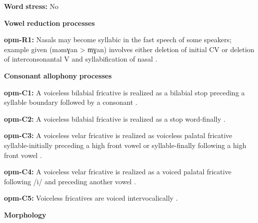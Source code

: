 \documentclass[output=paper]{langsci/langscibook}
\begin{document}
\begin{styleBody}
\textbf{Word} \textbf{stress:} No
\end{styleBody}

\begin{styleBody}
\textbf{Vowel} \textbf{reduction} \textbf{processes}
\end{styleBody}

\begin{styleBody}
\textbf{opm-R1:} Nasals may become syllabic in the fast speech of some speakers; example given (məmɣan > m̩ɣan) involves either deletion of initial CV or deletion of interconsonantal V and syllabification of nasal \citep[64]{Loughnane2009}.
\end{styleBody}

\begin{styleBody}
\textbf{Consonant} \textbf{allophony} \textbf{processes}
\end{styleBody}

\begin{styleBody}
\textbf{opm-C1:} A voiceless bilabial fricative is realized as a bilabial stop preceding a syllable boundary followed by a consonant \citep[33]{Loughnane2009}.
\end{styleBody}

\begin{styleBody}
\textbf{opm-C2:} A voiceless bilabial fricative is realized as a stop word-finally \citep[33]{Loughnane2009}.
\end{styleBody}

\begin{styleBody}
\textbf{opm-C3:} A voiceless velar fricative is realized as voiceless palatal fricative syllable-initially preceding a high front vowel or syllable-finally following a high front vowel \citep[42]{Loughnane2009}.
\end{styleBody}

\begin{styleBody}
\textbf{opm-C4:} A voiceless velar fricative is realized as a voiced palatal fricative following /i/ and preceding another vowel \citep[42]{Loughnane2009}.
\end{styleBody}

\begin{styleBody}
\textbf{opm-C5:} Voiceless fricatives are voiced intervocalically \citep[42]{Loughnane2009}.
\end{styleBody}

\begin{styleBody}
\textbf{Morphology}
\end{styleBody}
\end{document}
